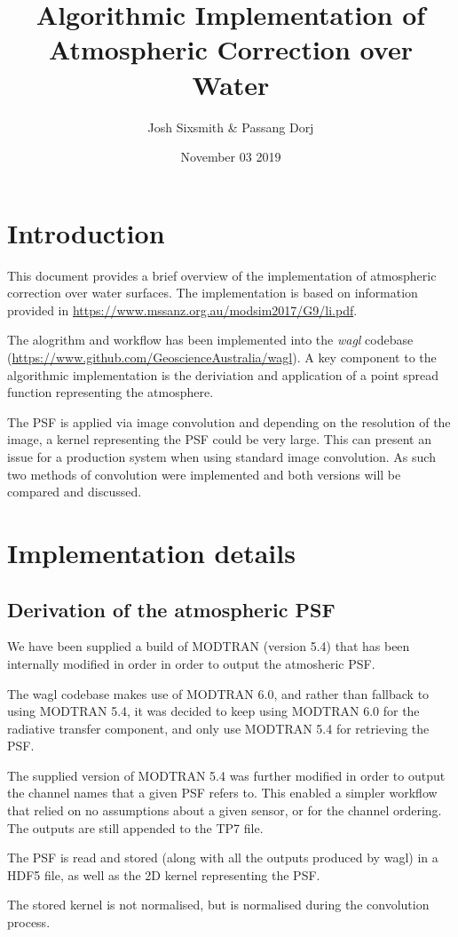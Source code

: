 \documentclass[a4paper]{article}
\title{Algorithmic Implementation of Atmospheric Correction over Water}
\date{November 03 2019}
\author{Josh Sixsmith \& Passang Dorj}
\begin{document}
  \maketitle
  \newpage

  \section{Introduction}

    \begin{flushleft}
      This document provides a brief overview of the implementation of atmospheric correction over water surfaces. The implementation is based on information provided in \url{https://www.mssanz.org.au/modsim2017/G9/li.pdf}. \par
      The alogrithm and workflow has been implemented into the \textit{wagl} codebase (\url{https://www.github.com/GeoscienceAustralia/wagl}). A key component to the algorithmic implementation is the deriviation and application of a point spread function representing the atmosphere. \par
      The PSF is applied via image convolution and depending on the resolution of the image, a kernel representing the PSF could be very large. This can present an issue for a production system when using standard image convolution. As such two methods of convolution were implemented and both versions will be compared and discussed.
    \end{flushleft}

  \section{Implementation details}

  \subsection{Derivation of the atmospheric PSF}

    \begin{flushleft}
      We have been supplied a build of MODTRAN (version 5.4) that has been internally modified in order in order to output the atmosheric PSF. \par
      The wagl codebase makes use of MODTRAN 6.0, and rather than fallback to using MODTRAN 5.4, it was decided to keep using MODTRAN 6.0 for the radiative transfer component, and only use MODTRAN 5.4 for retrieving the PSF. \par
      The supplied version of MODTRAN 5.4 was further modified in order to output the channel names that a given PSF refers to. This enabled a simpler workflow that relied on no assumptions about a given sensor, or for the channel ordering. The outputs are still appended to the TP7 file. \par
      The PSF is read and stored (along with all the outputs produced by wagl) in a HDF5 file, as well as the 2D kernel representing the PSF. \par
      The stored kernel is not normalised, but is normalised during the convolution process.
    \end{flushleft}
\end{document}
